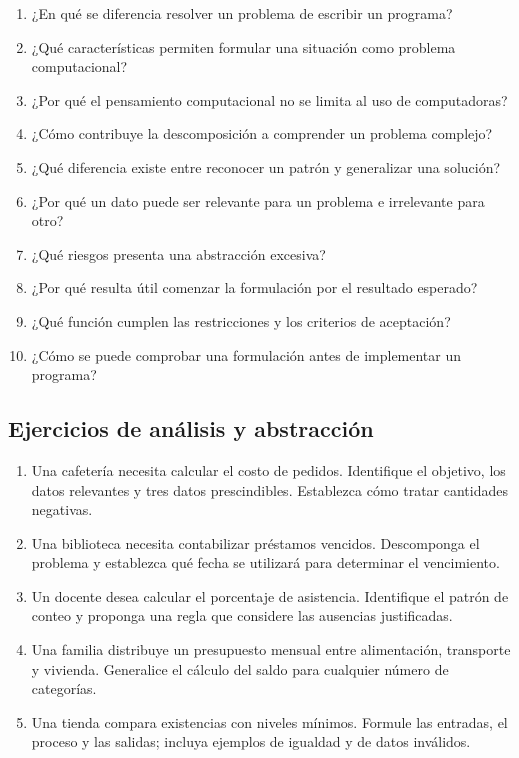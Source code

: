 \begin{enumerate}
\item ¿En qué se diferencia resolver un problema de escribir un programa?
\item ¿Qué características permiten formular una situación como problema computacional?
\item ¿Por qué el pensamiento computacional no se limita al uso de computadoras?
\item ¿Cómo contribuye la descomposición a comprender un problema complejo?
\item ¿Qué diferencia existe entre reconocer un patrón y generalizar una solución?
\item ¿Por qué un dato puede ser relevante para un problema e irrelevante para otro?
\item ¿Qué riesgos presenta una abstracción excesiva?
\item ¿Por qué resulta útil comenzar la formulación por el resultado esperado?
\item ¿Qué función cumplen las restricciones y los criterios de aceptación?
\item ¿Cómo se puede comprobar una formulación antes de implementar un programa?
\end{enumerate}

\subsection{Ejercicios de análisis y abstracción}

\begin{enumerate}
\item Una cafetería necesita calcular el costo de pedidos. Identifique el objetivo, los datos relevantes y tres datos prescindibles. Establezca cómo tratar cantidades negativas.
\item Una biblioteca necesita contabilizar préstamos vencidos. Descomponga el problema y establezca qué fecha se utilizará para determinar el vencimiento.
\item Un docente desea calcular el porcentaje de asistencia. Identifique el patrón de conteo y proponga una regla que considere las ausencias justificadas.
\item Una familia distribuye un presupuesto mensual entre alimentación, transporte y vivienda. Generalice el cálculo del saldo para cualquier número de categorías.
\item Una tienda compara existencias con niveles mínimos. Formule las entradas, el proceso y las salidas; incluya ejemplos de igualdad y de datos inválidos.
\end{enumerate}

